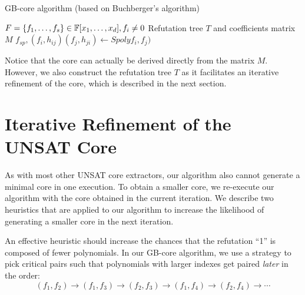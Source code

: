 \begin{algorithm}[H]
 \caption{GB-core algorithm (based on Buchberger's algorithm)}
 \label{algo:gbcore}
 \begin{algorithmic}[1]

 \REQUIRE $F = \{f_1, \dots, f_s\} \in {\mathbb{F}}[x_1, \dots, x_d], f_i\neq 0$
 \ENSURE Refutation tree $T$ and coefficients matrix $M$
 	\STATE  $f_{sp},(f_{i},h_{ij})(f_{j},h_{ji}) \gets Spolyf_i,f_j)$ 
 	\ENDIF
 	\ENDIF
 \ENDFOR
 \end{algorithmic}
 \end{algorithm}


Notice that the core can actually be derived directly from the matrix 
$M$. However, we also construct the refutation tree $T$ as it
facilitates an iterative refinement of the core, which is described
in the next section. 

\section{Iterative Refinement of the UNSAT Core}
\label{sec:iter}

As with most other UNSAT core extractors, our algorithm also cannot
generate a minimal core in one execution. To obtain a smaller core, we
 re-execute our algorithm with the core obtained in the current
iteration. We describe two heuristics that are applied to our
algorithm to increase the likelihood of generating a smaller core in
the next iteration.  

An effective heuristic should increase the chances that the refutation
``1'' is composed of fewer polynomials.  In our GB-core algorithm, we
use a strategy to pick critical pairs such that polynomials with
larger indexes get paired {\it later} in the order:
$$(f_1,f_2)\to(f_1,f_3)\to(f_2,f_3)\to(f_1,f_4)\to(f_2,f_4)\to\cdots$$

